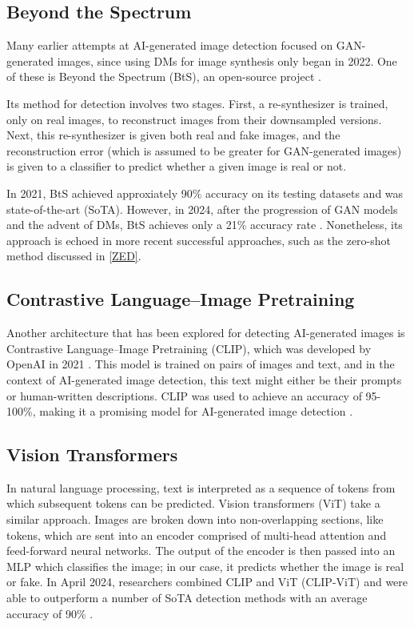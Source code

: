\documentclass{article} %
\begin{document}
\subsection{Beyond the Spectrum}

Many earlier attempts at AI-generated image detection focused on GAN-generated images, since using DMs for image synthesis only began in 2022. One of these is Beyond the Spectrum (BtS), an open-source project \citep{he2021spectrumdetectingdeepfakesresynthesis}.

Its method for detection involves two stages. First, a re-synthesizer is trained, only on real images, to reconstruct images from their downsampled versions. Next, this re-synthesizer is given both real and fake images, and the reconstruction error (which is assumed to be greater for GAN-generated images) is given to a classifier to predict whether a given image is real or not.

In 2021, BtS achieved approxiately 90\% accuracy on its testing datasets and was state-of-the-art (SoTA). However, in 2024, after the progression of GAN models and the advent of DMs, BtS achieves only a 21\% accuracy rate \citep{li2024adversarialaiartunderstandinggeneration}. Nonetheless, its approach is echoed in more recent successful approaches, such as the zero-shot method discussed in \ref{ZED}.

\subsection{Contrastive Language–Image Pretraining}

Another architecture that has been explored for detecting AI-generated images is Contrastive Language–Image Pretraining (CLIP), which was developed by OpenAI in 2021 \citep{radford2021learningtransferablevisualmodels}. This model is trained on pairs of images and text, and in the context of AI-generated image detection, this text might either be their prompts or human-written descriptions. CLIP was used to achieve an accuracy of 95-100\%, making it a promising model for AI-generated image detection \citep{moskowitz2024detectingaigeneratedimagesclip}.

\subsection{Vision Transformers}

In natural language processing, text is interpreted as a sequence of tokens from which subsequent tokens can be predicted. Vision transformers (ViT) take a similar approach. Images are broken down into non-overlapping sections, like tokens, which are sent into an encoder comprised of multi-head attention and feed-forward neural networks. The output of the encoder is then passed into an MLP which classifies the image; in our case, it predicts whether the image is real or fake. In April 2024, researchers combined CLIP and ViT (CLIP-ViT) and were able to outperform a number of SoTA detection methods with an average accuracy of 90\% \citep{cozzolino2024raisingbaraigeneratedimage}.
\end{document}
